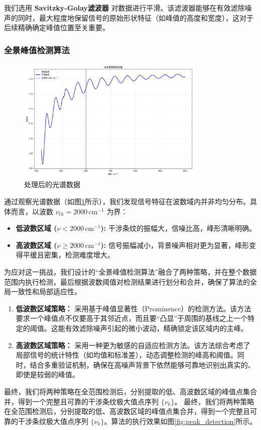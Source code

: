 \documentclass[withoutpreface,bwprint]{cumcmthesis} %
\begin{document}
我们选用 \textbf{Savitzky-Golay滤波器} 对数据进行平滑。该滤波器能够在有效滤除噪声的同时，最大程度地保留信号的原始形状特征（如峰值的高度和宽度），这对于后续精确确定峰值位置至关重要。


\subsubsection{全景峰值检测算法}

\begin{figure}
    \centering
    \includegraphics[width=0.8\textwidth]{figures/smoothing.png}
    \caption{处理后的光谱数据}
    \label{fig:smoothing}
\end{figure}

通过观察光谱数据（如图\ref{fig:smoothing}所示），我们发现信号特征在波数域内并非均匀分布。具体而言，以波数 $\nu_{th} = 2000 \, \text{cm}^{-1}$ 为界：
\begin{itemize}
    \item \textbf{低波数区域 ($\nu < 2000 \, \text{cm}^{-1}$):} 干涉条纹的振幅大，信噪比高，峰形清晰明确。
    \item \textbf{高波数区域 ($\nu \ge 2000 \, \text{cm}^{-1}$):} 信号振幅减小，背景噪声相对更为显著，峰形变得平缓且密集，检测难度增大。
\end{itemize}

为应对这一挑战，我们设计的“全景峰值检测算法”融合了两种策略，并在整个数据范围内执行检测，最后根据波数阈值对检测结果进行划分和合并，确保了算法的全局一致性和局部适应性。
\begin{enumerate}
    \item \textbf{低波数区域策略：} 采用基于峰值显著性（Prominence）的检测方法。该方法要求一个峰值点不仅要高于其邻近点，而且要“凸显”于周围的基线之上一个特定的阈值。这能有效滤除噪声引起的微小波动，精确锁定该区域内的主峰。
    \item \textbf{高波数区域策略：} 采用一种更为敏感的自适应检测方法。该方法综合考虑了局部信号的统计特性（如均值和标准差），动态调整检测的峰高和阈值。同时，结合多重验证机制，确保在高噪声背景下依然能够可靠地识别出真实的、即使是较弱的峰值。
\end{enumerate}
最终，我们将两种策略在全范围检测后，分别提取的低、高波数区域的峰值点集合并，得到一个完整且可靠的干涉条纹极大值点序列 $\{\nu_k\}$。
最终，我们将两种策略在全范围检测后，分别提取的低、高波数区域的峰值点集合并，得到一个完整且可靠的干涉条纹极大值点序列 $\{\nu_k\}$。算法的执行效果如图\ref{fig:peak_detection}所示。
\end{document}
